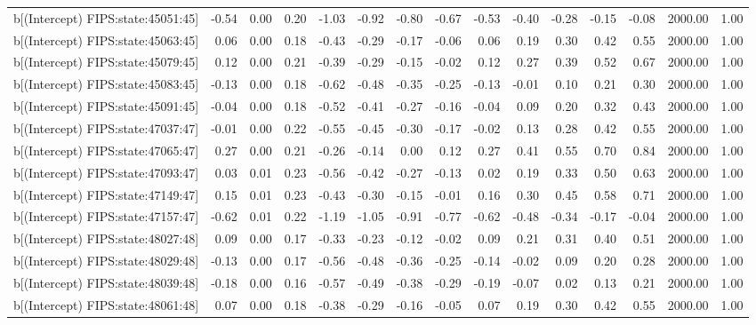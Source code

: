 \begin{table}[ht]
\begin{tabular}{rrrrrrrrrrrrrrr}
  b[(Intercept) FIPS:state:45051:45] & -0.54 & 0.00 & 0.20 & -1.03 & -0.92 & -0.80 & -0.67 & -0.53 & -0.40 & -0.28 & -0.15 & -0.08 & 2000.00 & 1.00 \\ 
  b[(Intercept) FIPS:state:45063:45] & 0.06 & 0.00 & 0.18 & -0.43 & -0.29 & -0.17 & -0.06 & 0.06 & 0.19 & 0.30 & 0.42 & 0.55 & 2000.00 & 1.00 \\ 
  b[(Intercept) FIPS:state:45079:45] & 0.12 & 0.00 & 0.21 & -0.39 & -0.29 & -0.15 & -0.02 & 0.12 & 0.27 & 0.39 & 0.52 & 0.67 & 2000.00 & 1.00 \\ 
  b[(Intercept) FIPS:state:45083:45] & -0.13 & 0.00 & 0.18 & -0.62 & -0.48 & -0.35 & -0.25 & -0.13 & -0.01 & 0.10 & 0.21 & 0.30 & 2000.00 & 1.00 \\ 
  b[(Intercept) FIPS:state:45091:45] & -0.04 & 0.00 & 0.18 & -0.52 & -0.41 & -0.27 & -0.16 & -0.04 & 0.09 & 0.20 & 0.32 & 0.43 & 2000.00 & 1.00 \\ 
  b[(Intercept) FIPS:state:47037:47] & -0.01 & 0.00 & 0.22 & -0.55 & -0.45 & -0.30 & -0.17 & -0.02 & 0.13 & 0.28 & 0.42 & 0.55 & 2000.00 & 1.00 \\ 
  b[(Intercept) FIPS:state:47065:47] & 0.27 & 0.00 & 0.21 & -0.26 & -0.14 & 0.00 & 0.12 & 0.27 & 0.41 & 0.55 & 0.70 & 0.84 & 2000.00 & 1.00 \\ 
  b[(Intercept) FIPS:state:47093:47] & 0.03 & 0.01 & 0.23 & -0.56 & -0.42 & -0.27 & -0.13 & 0.02 & 0.19 & 0.33 & 0.50 & 0.63 & 2000.00 & 1.00 \\ 
  b[(Intercept) FIPS:state:47149:47] & 0.15 & 0.01 & 0.23 & -0.43 & -0.30 & -0.15 & -0.01 & 0.16 & 0.30 & 0.45 & 0.58 & 0.71 & 2000.00 & 1.00 \\ 
  b[(Intercept) FIPS:state:47157:47] & -0.62 & 0.01 & 0.22 & -1.19 & -1.05 & -0.91 & -0.77 & -0.62 & -0.48 & -0.34 & -0.17 & -0.04 & 2000.00 & 1.00 \\ 
  b[(Intercept) FIPS:state:48027:48] & 0.09 & 0.00 & 0.17 & -0.33 & -0.23 & -0.12 & -0.02 & 0.09 & 0.21 & 0.31 & 0.40 & 0.51 & 2000.00 & 1.00 \\ 
  b[(Intercept) FIPS:state:48029:48] & -0.13 & 0.00 & 0.17 & -0.56 & -0.48 & -0.36 & -0.25 & -0.14 & -0.02 & 0.09 & 0.20 & 0.28 & 2000.00 & 1.00 \\ 
  b[(Intercept) FIPS:state:48039:48] & -0.18 & 0.00 & 0.16 & -0.57 & -0.49 & -0.38 & -0.29 & -0.19 & -0.07 & 0.02 & 0.13 & 0.21 & 2000.00 & 1.00 \\ 
  b[(Intercept) FIPS:state:48061:48] & 0.07 & 0.00 & 0.18 & -0.38 & -0.29 & -0.16 & -0.05 & 0.07 & 0.19 & 0.30 & 0.42 & 0.55 & 2000.00 & 1.00 \\ 

\end{tabular}
\end{table}
